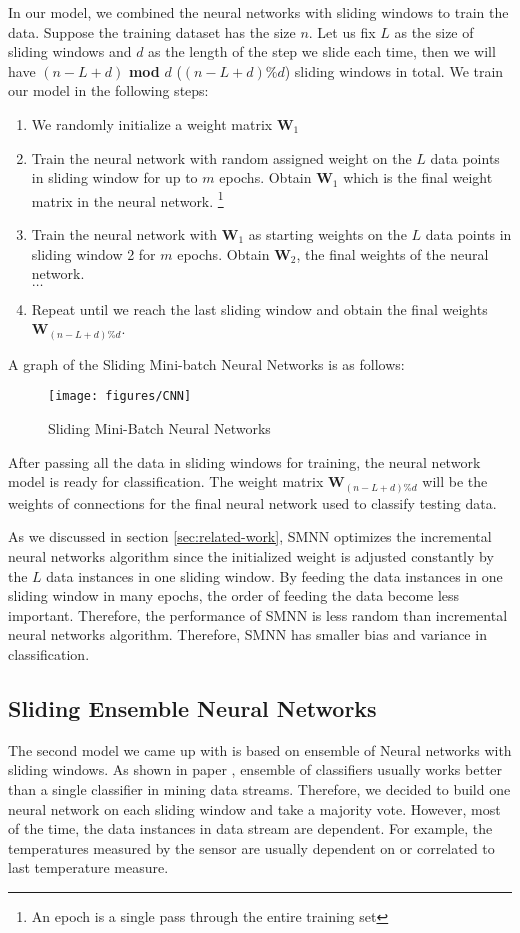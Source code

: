 \documentclass[conference]{IEEEtran}
\begin{document}
		In our model, we combined the neural networks with sliding windows to train the data. Suppose the training dataset has the size $n$. Let us fix $L$ as the size of sliding windows and $d$ as the length of the step we slide each time, then we will have $(n-L+d)$ \textbf{mod} $d$ ($(n-L+d)\%d$) sliding windows in total. We train our model in the following steps: 
		\begin{enumerate}
			\item We randomly initialize a weight matrix $\textbf{W}_1$
			\item Train the neural network with random assigned weight on the $L$ data points in sliding window for up to $m$ epochs. Obtain $\textbf{W}_1$ which is the final weight matrix in the neural network.
			\footnote{An epoch is a single pass through the entire training set} 
			\item Train the neural network with $\textbf{W}_1$ as starting weights on the $L$ data points in sliding window 2 for $m$ epochs. Obtain $\textbf{W}_2$, the final weights of the neural network.\\
			$\ldots$
			\item Repeat until we reach the last sliding window and obtain the final weights $\textbf{W}_{(n-L+d)\%d}$.
		\end{enumerate}
		A graph of the Sliding Mini-batch Neural Networks is as follows:
		\begin{figure}[H]
			\centering
			\texttt{[image: figures/CNN]}
			\caption{Sliding Mini-Batch Neural Networks}
			\label{fig:minibatchANN}
		\end{figure}
		After passing all the data in sliding windows for training, the neural network model is ready for classification. The weight matrix $\textbf{W}_{(n-L+d)\%d}$ will be the weights of connections for the final neural network used to classify testing data.
		
		As we discussed in section \ref{sec:related-work}, SMNN optimizes the incremental neural networks algorithm since the initialized weight is adjusted constantly by the $L$ data instances in one sliding window. By feeding the data instances in one sliding window in many epochs, the order of feeding the data become less important. Therefore, the performance of SMNN is less random than incremental neural networks algorithm. Therefore, SMNN has smaller bias and variance in classification.
		
		
		\subsection{Sliding Ensemble Neural Networks}
		The second model we came up with is based on ensemble of Neural networks with sliding windows. As shown in paper \cite{ensemble1}, ensemble of classifiers usually works better than a single classifier in mining data streams. Therefore, we decided to build one neural network on each sliding window and take a majority vote. However, most of the time, the data instances in data stream are dependent. For example, the temperatures measured by the sensor are usually dependent on or correlated to last temperature measure.
		
\end{document}

